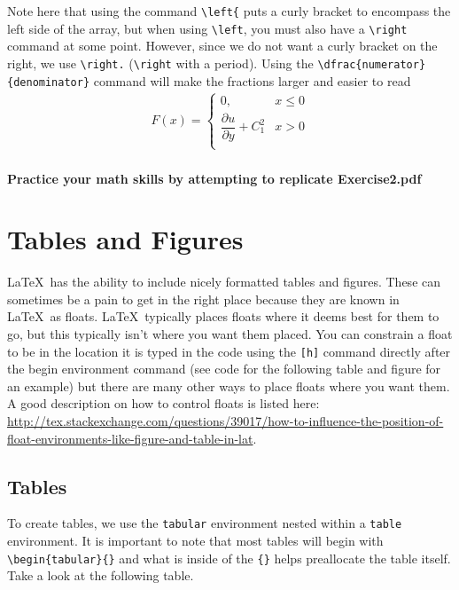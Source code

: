 \documentclass[]{article}%
\newcommand{\bs}{\textbackslash}
\newcommand{\TT}[1]{\texttt{#1}}
\newcommand{\tpc}{\textperiodcentered}
\theoremstyle{definition}
\begin{document}
Note here that using the command \TT{\bs left\{} puts a curly bracket to encompass the left side of the array, but when using \TT{\bs left}, you must also have a \TT{\bs right} command at some point. However, since we do not want a curly bracket on the right, we use \TT{\bs right.} (\TT{\bs right} with a period). 
%
Using the \TT{\bs dfrac\{numerator\}\{denominator\}} command will make the fractions larger and easier to read
\begin{align}
\label{eq:exampledel}
F(x) = \left\{ 
\begin{array}{ll}
	0, & x \leq 0 \\
	\dfrac{\partial u}{\partial y} + C_1^2  & x > 0\\
\end{array}
\right. 
\end{align}

\paragraph{Practice your math skills by attempting to replicate Exercise2.pdf}
\clearpage


\section{Tables and Figures}
\LaTeX\ has the ability to include nicely formatted tables and figures.
These can sometimes be a pain to get in the right place because they are known in \LaTeX\ as floats.
\LaTeX\ typically places floats where it deems best for them to go, but this typically isn't where you want them placed.
You can constrain a float to be in the location it is typed in the code using the \texttt{[h]} command directly after the begin environment command (see code for the following table and figure for an example) but there are many other ways to place floats where you want them.
A good description on how to control floats is listed here: \url{http://tex.stackexchange.com/questions/39017/how-to-influence-the-position-of-float-environments-like-figure-and-table-in-lat}.

\label{sec:tablesfigures}
\subsection{Tables}
To create tables, we use the \TT{tabular} environment nested within a \TT{table} environment.
It is important to note that most tables will begin with \TT{\bs begin\{tabular\}\{\tpc\}} and what is inside of the \TT{\{\tpc\}} helps preallocate the table itself.
Take a look at the following table.
\end{document}
